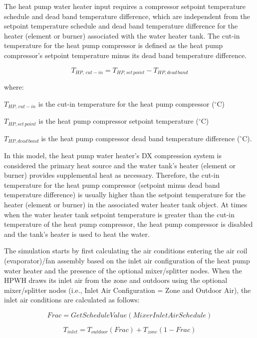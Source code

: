 The heat pump water heater input requires a compressor setpoint temperature schedule and dead band temperature difference, which are independent from the setpoint temperature schedule and dead band temperature difference for the heater (element or burner) associated with the water heater tank. The cut-in temperature for the heat pump compressor is defined as the heat pump compressor's setpoint temperature minus its dead band temperature difference.

\begin{equation}
{T_{HP,\,cut - in}} = {T_{HP,set\,point}} - {T_{HP,dead\,band}}
\end{equation}

where:

\({T_{HP,\,cut - in}}\) is the cut-in temperature for the heat pump compressor (\(^{\circ}\)C)

\({T_{HP,set\,point}}\) is the heat pump compressor setpoint temperature (\(^{\circ}\)C)

\({T_{HP,dead\,band}}\) is the heat pump compressor dead band temperature difference (\(^{\circ}\)C).

In this model, the heat pump water heater's DX compression system is considered the primary heat source and the water tank's heater (element or burner) provides supplemental heat as necessary. Therefore, the cut-in temperature for the heat pump compressor (setpoint minus dead band temperature difference) is usually higher than the setpoint temperature for the heater (element or burner) in the associated water heater tank object. At times when the water heater tank setpoint temperature is greater than the cut-in temperature of the heat pump compressor, the heat pump compressor is disabled and the tank's heater is used to heat the water.

The simulation starts by first calculating the air conditions entering the air coil (evaporator)/fan assembly based on the inlet air configuration of the heat pump water heater and the presence of the optional mixer/splitter nodes. When the HPWH draws its inlet air from the zone and outdoors using the optional mixer/splitter nodes (i.e., Inlet Air Configuration = Zone and Outdoor Air), the inlet air conditions are calculated as follows:

\begin{equation}
Frac = GetScheduleValue(MixerInletAirSchedule)
\end{equation}

\begin{equation}
{T_{inlet}} = {T_{outdoor}}\left( {Frac} \right) + {T_{zone}}\left( {1 - Frac} \right)
\end{equation}


